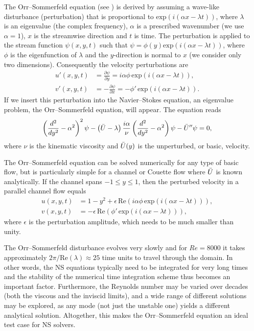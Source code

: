 The Orr--Sommerfeld equation (see \citet{Orzag1971}) is derived by
assuming a wave-like disturbance (perturbation) that is proportional to
$\text{exp}(i(\alpha x-\lambda t))$, where $\lambda$ is an eigenvalue
(the complex frequency), $\alpha$
is a prescribed wavenumber (we use $\alpha=1$), $x$ is the streamwise
direction and $t$ is time. The perturbation is applied to the stream
function $\psi(x,y,t)$ such that $\psi=\phi(y) \text{exp}(i(\alpha
x- \lambda t))$, where $\phi$ is the eigenfunction of $\lambda$
and the $y$-direction is normal to $x$ (we consider only two
dimensions). Consequently the velocity perturbations are
\begin{align}
 u'(x,y,t)&=\frac{\partial \psi}{\partial y}=i\alpha \phi \, \text{exp}(i(\alpha x- \lambda t)),
\\
 v'(x,y,t)&=-\frac{\partial \psi}{\partial x}=-\phi' \, \text{exp}(i(\alpha x- \lambda t)).
\end{align}
If we insert this perturbation into the Navier--Stokes equation, an
eigenvalue problem, the Orr--Sommerfeld equation, will appear. The
equation reads
\begin{equation}
 \left( \frac{d^2}{dy^2}-\alpha^2\right)^2\psi
      - \left(\Bar{U}-\lambda \right) \frac{i \alpha}{\nu}
          \left( \frac{d^2}{dy^2}-\alpha^2\right)\psi - \Bar{U}''\psi=0,
 \label{eq:mortensen:OrrS}
\end{equation}
where $\nu$ is the kinematic viscosity and $\Bar{U}(y)$ is the
unperturbed, or basic, velocity.

The Orr--Sommerfeld equation can be solved numerically for any type of
basic flow, but is particularly simple for a channel or Couette flow
where $\Bar{U}$ is known analytically. If the channel spans
$-1\leqslant y \leqslant 1$, then the perturbed velocity in a parallel
channel flow equals
\begin{equation}
\begin{split}
 u(x,y,t)&=1-y^2+\epsilon \,\text{Re}\left(i\alpha \phi \, \text{exp}(i(\alpha x-\lambda t))\right),
\\
 v(x,y,t)&=-\epsilon \, \text{Re}\left(\phi' \, \text{exp}(i(\alpha x-\lambda t))\right),
\end{split}
\label{eq:mortensen:channel}
\end{equation}
where $\epsilon$ is the perturbation amplitude, which needs to be much
smaller than unity.

The Orr--Sommerfeld disturbance evolves very slowly and for $Re=8000$ it
takes approximately $2 \pi/\text{Re}(\lambda)\approx 25$ time units to
travel through the domain. In other words, the NS equations typically need
to be integrated for very long times and the stability of the numerical
time integration scheme thus becomes an important factor. Furthermore,
the Reynolds number may be varied over decades (both the viscous and the
inviscid limits), and a wide range of different solutions may be explored,
as any mode (not just the unstable one) yields a different analytical
solution. Altogether, this makes the Orr--Sommerfeld equation an ideal
test case for NS solvers.

